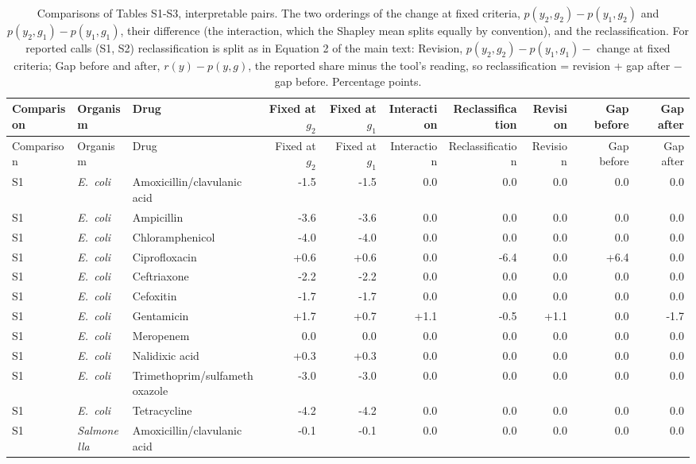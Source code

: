 \clearpage
{\scriptsize
\begin{longtable}{lllrrrrrrr}
\caption{Comparisons of Tables S1-S3, interpretable pairs. The two orderings of the change at fixed criteria, $p(y_2, g_2) - p(y_1, g_2)$ and $p(y_2, g_1) - p(y_1, g_1)$, their difference (the interaction, which the Shapley mean splits equally by convention), and the reclassification. For reported calls (S1, S2) reclassification is split as in Equation 2 of the main text: Revision, $p(y_2, g_2) - p(y_1, g_1) -$ change at fixed criteria; Gap before and after, $r(y) - p(y, g)$, the reported share minus the tool's reading, so reclassification = revision + gap after $-$ gap before. Percentage points.}\\
\toprule
Comparison & Organism & Drug & Fixed at $g_2$ & Fixed at $g_1$ & Interaction & Reclassification & Revision & Gap before & Gap after \\
\midrule
\endfirsthead
\toprule
Comparison & Organism & Drug & Fixed at $g_2$ & Fixed at $g_1$ & Interaction & Reclassification & Revision & Gap before & Gap after \\
\midrule
\endhead
S1 & \textit{E.~coli} & Amoxicillin/clavulanic acid & -1.5 & -1.5 & 0.0 & 0.0 & 0.0 & 0.0 & 0.0 \\
S1 & \textit{E.~coli} & Ampicillin & -3.6 & -3.6 & 0.0 & 0.0 & 0.0 & 0.0 & 0.0 \\
S1 & \textit{E.~coli} & Chloramphenicol & -4.0 & -4.0 & 0.0 & 0.0 & 0.0 & 0.0 & 0.0 \\
S1 & \textit{E.~coli} & Ciprofloxacin & +0.6 & +0.6 & 0.0 & -6.4 & 0.0 & +6.4 & 0.0 \\
S1 & \textit{E.~coli} & Ceftriaxone & -2.2 & -2.2 & 0.0 & 0.0 & 0.0 & 0.0 & 0.0 \\
S1 & \textit{E.~coli} & Cefoxitin & -1.7 & -1.7 & 0.0 & 0.0 & 0.0 & 0.0 & 0.0 \\
S1 & \textit{E.~coli} & Gentamicin & +1.7 & +0.7 & +1.1 & -0.5 & +1.1 & 0.0 & -1.7 \\
S1 & \textit{E.~coli} & Meropenem & 0.0 & 0.0 & 0.0 & 0.0 & 0.0 & 0.0 & 0.0 \\
S1 & \textit{E.~coli} & Nalidixic acid & +0.3 & +0.3 & 0.0 & 0.0 & 0.0 & 0.0 & 0.0 \\
S1 & \textit{E.~coli} & Trimethoprim/sulfamethoxazole & -3.0 & -3.0 & 0.0 & 0.0 & 0.0 & 0.0 & 0.0 \\
S1 & \textit{E.~coli} & Tetracycline & -4.2 & -4.2 & 0.0 & 0.0 & 0.0 & 0.0 & 0.0 \\
S1 & \textit{Salmonella} & Amoxicillin/clavulanic acid & -0.1 & -0.1 & 0.0 & 0.0 & 0.0 & 0.0 & 0.0 \\

\end{longtable}}
